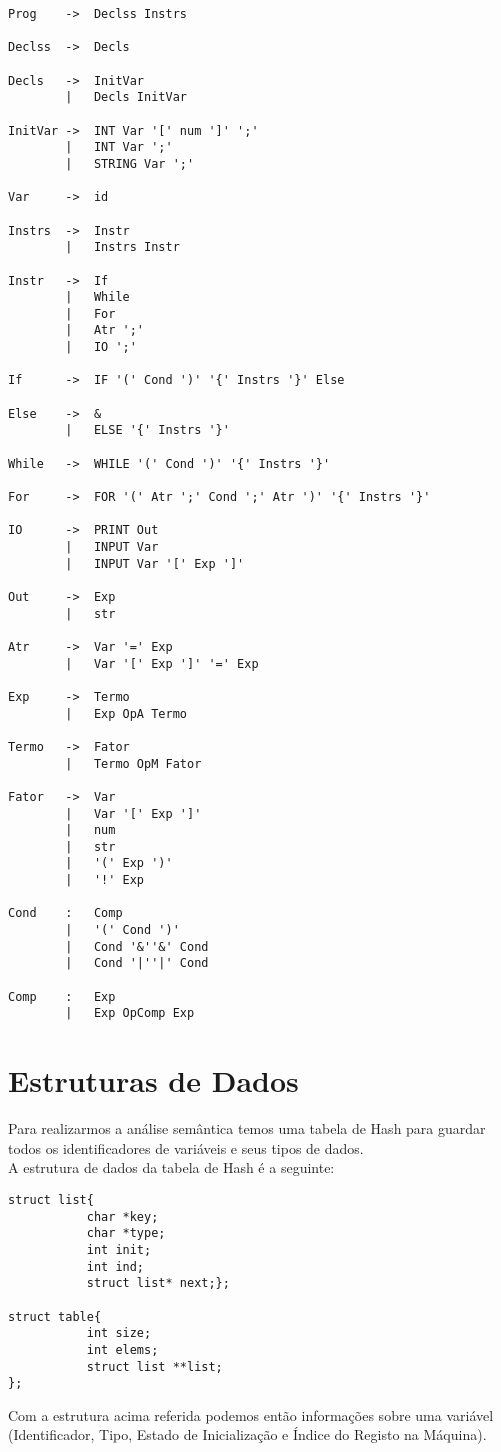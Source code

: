 \documentclass{report}
\begin{document}
\begin{verbatim}
Prog    ->  Declss Instrs

Declss  ->  Decls

Decls   ->  InitVar
        |   Decls InitVar

InitVar ->  INT Var '[' num ']' ';'
        |   INT Var ';'
        |   STRING Var ';'

Var     ->  id

Instrs  ->  Instr
        |   Instrs Instr

Instr   ->  If
        |   While
        |   For
        |   Atr ';'
        |   IO ';'

If      ->  IF '(' Cond ')' '{' Instrs '}' Else

Else    ->  &
        |   ELSE '{' Instrs '}'

While   ->  WHILE '(' Cond ')' '{' Instrs '}'

For     ->  FOR '(' Atr ';' Cond ';' Atr ')' '{' Instrs '}'

IO      ->  PRINT Out
        |   INPUT Var
        |   INPUT Var '[' Exp ']'

Out     ->  Exp
        |   str

Atr     ->  Var '=' Exp
        |   Var '[' Exp ']' '=' Exp

Exp     ->  Termo
        |   Exp OpA Termo

Termo   ->  Fator
        |   Termo OpM Fator

Fator   ->  Var
        |   Var '[' Exp ']'
        |   num
        |   str
        |   '(' Exp ')'
        |   '!' Exp

Cond    :   Comp
        |   '(' Cond ')'
        |   Cond '&''&' Cond
        |   Cond '|''|' Cond

Comp    :   Exp
        |   Exp OpComp Exp
\end{verbatim}

\section{Estruturas de Dados}
Para realizarmos a análise semântica temos uma tabela de Hash para guardar todos os identificadores de variáveis e seus tipos de dados. \\A estrutura de dados da tabela de Hash é a seguinte:\\
\begin{verbatim}
struct list{
           char *key;
           char *type;
           int init;
           int ind;
           struct list* next;};

struct table{
           int size;
           int elems;
           struct list **list;
};
\end{verbatim}
Com a estrutura acima referida podemos então informações sobre uma variável (Identificador, Tipo, Estado de Inicialização e Índice do Registo na Máquina).
\end{document}
